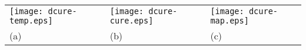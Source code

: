 \documentclass[10pt,a4paper]{article}
\begin{document}
\begin{tabular}{l@{}l@{}l}
             \texttt{[image: dcure-temp.eps]}&    \texttt{[image: dcure-cure.eps]}&\texttt{[image: dcure-map.eps]}\\
(a)  &(b)&(c)
\end{tabular}
\end{document}
